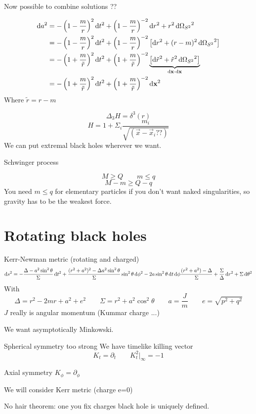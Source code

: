 Now possible to combine solutions ??

\begin{align*}
\diff{a}^2 &= - \left(1- \frac{m}{r}\right)^2 \diff{t}^2 + \left(1 - \frac{m}{r}\right)^{-2}\diff{r}^2 + r^2 \diff{\Omega_{S^2}}^2 \\
&= - \left(1 - \frac{m}{r}\right)^2 \diff{t}^2 + \left(1 - \frac{m}{r}\right)^{-2}\left[\diff{r}^2 + (r-m)^2 \diff{\Omega_{S^2}}^2\right] \\
&= - \left(1 + \frac{m}{\tilde{r}}\right)^2 \diff{t}^2 + \left(1+ \frac{m}{\tilde{r}}\right)^{-2}\underbrace{\left[\diff{\tilde{r}^2} + \tilde{r}^2 \diff{\Omega_{S^2}}^2\right]}_{\diff{\vec{x}}\cdot\diff{\vec{x}}} \\
&= - \left(1+ \frac{m}{\tilde{r}}\right)^2 \diff{t}^2 + \left(1+ \frac{m}{\tilde{r}}\right)^{-2} \diff{\vec{x}}^2
\end{align*}
Where $\tilde{r} = r-m$

\[\Delta_3 H = \delta^3(r)\]
\[ H = 1 + \Sigma_i \frac{m_i}{\sqrt{(\vec{x}-\vec{x}_i ??)}} \]
We can put extremal black holes wherever we want.

Schwinger process

\[ M \geq Q \qquad m \leq q \]
\[ M-m \geq Q-q \]
You need $m \leq q$ for elementary particles if you don't want naked singularities, so gravity has to be the weakest force.

\section{Rotating black holes}
Kerr-Newman metric (rotating and charged)
\[ \operatorname{d \!}{s}^2 = - \frac{\Delta - a^2\sin^2\theta}{\Sigma}\operatorname{d \!}{t}^2 + \frac{(r^2+a^2)^2 - \Delta a^2\sin^2\theta}{\Sigma}\sin^2\theta \operatorname{d \!}{\phi}^2 - 2 a \sin^2\theta \operatorname{d \!}{t}\operatorname{d \!}{\phi}\frac{(r^2 + a^2) - \Delta}{\Sigma} + \frac{\Sigma}{\Delta}\operatorname{d \!}{r}^2 + \Sigma \operatorname{d \!}{\theta}^2 \]
With
\[ \Delta = r^2 - 2mr + a^2 + e^2 \qquad \Sigma = r^2 + a^2\cos^2\theta \qquad a = \frac{J}{m} \qquad e = \sqrt{p^2+q^2} \]
$J$ really is angular momentum (Kummar charge ...)

We want asymptotically Minkowski.

Spherical symmetry too strong 
We have timelike killing vector
\[K_t = \partial_t \qquad K_t^2|_{\infty} = -1\]

Axial symmetry $K_\phi = \partial_\phi$

We will consider Kerr metric (charge e=0)

No hair theorem: one you fix charges black hole is uniquely defined.

